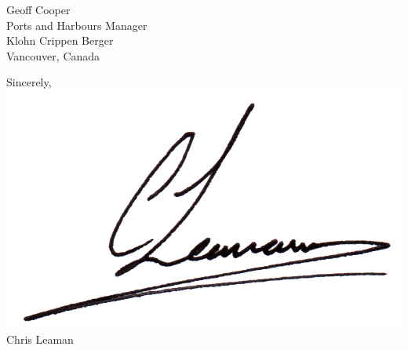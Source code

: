 \documentclass[paper=a4,fontsize=11pt,DIV=16, parskip=half,firstfoot=false]{scrlttr2}
\newcommand{\forceindent}{\leavevmode{\parindent=1em\indent}}
\begin{document}
\begin{letter}{Geoff Cooper\\Ports and Harbours Manager\\Klohn Crippen Berger\\Vancouver, Canada}


\forceindent Sincerely, \\
\includegraphics[scale=0.80]{media/signature.png} \\
Chris Leaman



\end{letter}
\end{document}
